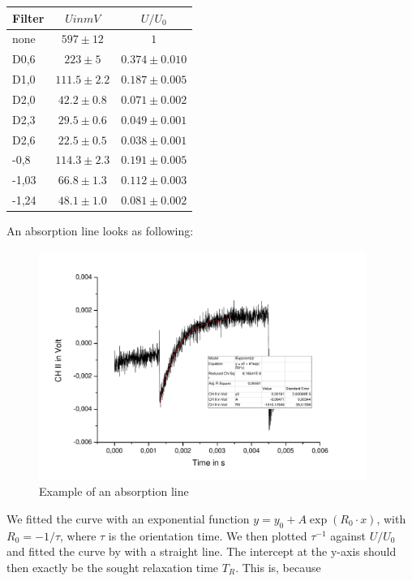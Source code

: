 \begin{center}
\begin{tabular}[H]{l | c c}
Filter & $U in mV$ & $U/U_0$ \\ \hline
none & $597 \pm 12$ &    $1$\\
D0,6 & $223 \pm 5$ &        $0.374 \pm 0.010$ \\
D1,0 & $111.5 \pm 2.2$ & $ 0.187 \pm 0.005$ \\
D2,0 & $42.2 \pm 0.8$ &   $ 0.071 \pm 0.002$\\
D2,3 & $29.5 \pm 0.6$ &   $ 0.049 \pm 0.001$\\
D2,6 & $22.5 \pm 0.5$ &    $0.038 \pm 0.001$\\
-0,8  & $114.3 \pm 2.3$ &  $0.191 \pm 0.005$\\
-1,03 & $66.8 \pm 1.3 $&   $0.112 \pm 0.003$\\
-1,24 & $48.1 \pm 1.0$ &   $0.081 \pm 0.002$\\
\end{tabular}
\end{center}

An absorption line looks as following: 

\begin{figure}[H]
\centering \includegraphics[width=0.95\textwidth]{BilderAusw/DehmeltBsp.pdf}
\caption{Example of an absorption line}
\label{dehmeltbsp}
\end{figure}

We fitted the curve with an exponential function $y=y_0 + A\exp(R_0\cdot x)$, with $R_0 = -1/\tau$, where $\tau$ is the orientation time. We then plotted $\tau^{-1}$ against $U/U_0$ and fitted the curve by with a straight line. The intercept at the y-axis should then exactly be the sought relaxation time $T_R$. This is, because


